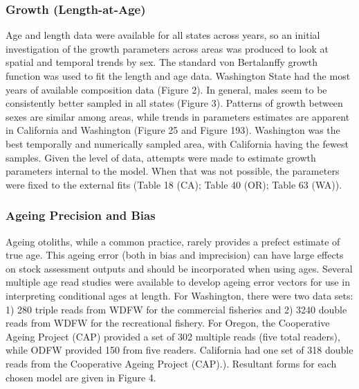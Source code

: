\documentclass[11pt,
  english,
  letterpaper,
]{article}
\begin{document}
\hypertarget{growth-length-at-age}{%
\subsubsection{Growth (Length-at-Age)}\label{growth-length-at-age}}

Age and length data were available for all states across years, so an initial investigation of the growth parameters across areas was produced to look at spatial and temporal trends by sex. The standard von Bertalanffy growth function was used to fit the length and age data. Washington State had the most years of available composition data (Figure 2). In general, males seem to be consistently better sampled in all states (Figure 3). Patterns of growth between sexes are similar among areas, while trends in parameters estimates are apparent in California and Washington (Figure 25 and Figure 193). Washington was the best temporally and numerically sampled area, with California having the fewest samples. Given the level of data, attempts were made to estimate growth parameters internal to the model. When that was not possible, the parameters were fixed to the external fits (Table 18 (CA); Table 40 (OR); Table 63 (WA)).

\hypertarget{ageing-precision-and-bias}{%
\subsubsection{Ageing Precision and Bias}\label{ageing-precision-and-bias}}

Ageing otoliths, while a common practice, rarely provides a prefect estimate of true age. This ageing error (both in bias and imprecision) can have large effects on stock assessment outputs and should be incorporated when using ages. Several multiple age read studies were available to develop ageing error vectors for use in interpreting conditional ages at length. For Washington, there were two data sets: 1) 280 triple reads from WDFW for the commercial fisheries and 2) 3240 double reads from WDFW for the recreational fishery. For Oregon, the Cooperative Ageing Project (CAP) provided a set of 302 multiple reads (five total readers), while ODFW provided 150 from five readers. California had one set of 318 double reads from the Cooperative Ageing Project (CAP).). Resultant forms for each chosen model are given in Figure 4.
\end{document}

